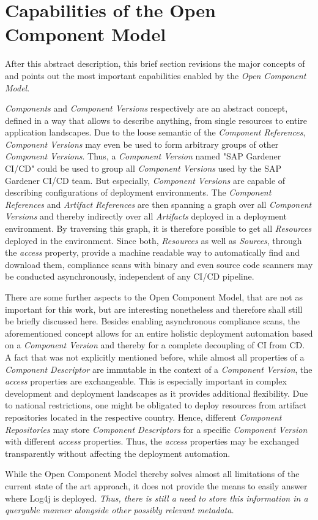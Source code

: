 \section{Capabilities of the Open Component Model}
After this abstract description, this brief section revisions the major concepts of and points out the most important capabilities enabled by the \emph{Open Component Model}.\par 
\emph{Components} and \emph{Component Versions} respectively are an abstract concept, defined in a way that allows to describe anything, from single resources to entire application landscapes. Due to the loose semantic of the \emph{Component References}, \emph{Component Versions} may even be used to form arbitrary groups of other \emph{Component Versions}. Thus, a \emph{Component Version} named "SAP Gardener CI/CD" could be used to group all \emph{Component Versions} used by the SAP Gardener CI/CD team. But especially, \emph{Component Versions} are capable of describing configurations of deployment environments. The \emph{Component References} and \emph{Artifact References} are then spanning a graph over all \emph{Component Versions} and thereby indirectly over all \emph{Artifacts} deployed in a deployment environment. By traversing this graph, it is therefore possible to get all \emph{Resources} deployed in the environment. Since both, \emph{Resources} as well as \emph{Sources}, through the \emph{access} property, provide a machine readable way to automatically find and download them, compliance scans with binary and even source code scanners may be conducted asynchronously, independent of any CI/CD pipeline.\par
There are some further aspects to the Open Component Model, that are not as important for this work, but are interesting nonetheless and therefore shall still be briefly discussed here. Besides enabling asynchronous compliance scans, the aforementioned concept allows for an entire holistic deployment automation based on a \emph{Component Version} and thereby for a complete decoupling of CI from CD. A fact that was not explicitly mentioned before, while almost all properties of a \emph{Component Descriptor} are immutable in the context of a \emph{Component Version}, the \emph{access} properties are exchangeable. This is especially important in complex development and deployment landscapes as it provides additional flexibility. Due to national restrictions, one might be obligated to deploy resources from artifact repositories located in the respective country. Hence, different \emph{Component Repositories} may store \emph{Component Descriptors} for a specific \emph{Component Version} with different \emph{access} properties. Thus, the \emph{access} properties may be exchanged transparently without affecting the deployment automation.\par
While the Open Component Model thereby solves almost all limitations of the current state of the art approach, it does not provide the means to easily answer where Log4j is deployed. \emph{Thus, there is still a need to store this information in a queryable manner alongside other possibly relevant metadata.}

